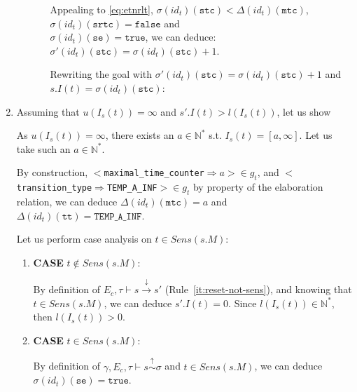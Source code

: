\documentclass[dvipsnames,12pt]{article}
\begin{document}
\begin{niproof}
\begin{enumerate}
\begin{enumerate}
\begin{enumerate}
        Appealing to \eqref{eq:etnrlt},
        $\sigma(id_t)(\texttt{stc})<\Delta(id_t)(\texttt{mtc})$,
        $\sigma(id_t)(\texttt{srtc})=\mathtt{false}$ and\\
        $\sigma(id_t)(\texttt{se})=\mathtt{true}$, we can deduce:
        $\sigma'(id_t)(\texttt{stc})=\sigma(id_t)(\texttt{stc})+1$.

        Rewriting the goal with
        $\sigma'(id_t)(\texttt{stc})=\sigma(id_t)(\texttt{stc})+1$ and
        $s.I(t)=\sigma(id_t)(\texttt{stc})$: 
      \end{enumerate}
    \end{enumerate}
    
  \item

    Assuming that $u(I_s(t))=\infty$ and
    $s'.I(t)>{}l(I_s(t))$, let us show\\

    As $u(I_s(t))=\infty$, there exists an $a\in\mathbb{N}^{*}$
    s.t. $I_s(t)=[a,\infty]$. Let us take such an
    $a\in\mathbb{N}^{*}$.

    By construction,
    ${<}$\texttt{maximal\_time\_counter}$\Rightarrow{}a{>}\in{}g_t$,
    and
    ${<}$\texttt{transition\_type}$\Rightarrow{}$\texttt{TEMP\_A\_INF}${>}\in{}g_t$
    by property of the elaboration relation, we can deduce
    $\Delta(id_t)(\texttt{mtc})=a$ and
    $\Delta(id_t)(\texttt{tt})=\mathtt{TEMP\_A\_INF}$.
    
    Let us perform case analysis on $t\in{}Sens(s.M)$:
    \begin{enumerate}
    \item \textbf{CASE} $t\notin{}Sens(s.M)$:
      
      By definition of $E_c,\tau\vdash{}s\xrightarrow{\downarrow}s'$
      (Rule~\ref{it:reset-not-sens}), and knowing that
      $t\in{}Sens(s.M)$, we can deduce $s'.I(t)=0$. Since
      $l(I_s(t))\in\mathbb{N}^{*}$, then $l(I_s(t))>0$.
      
      
    \item \textbf{CASE} $t\in{}Sens(s.M)$:
      
      By definition of
      $\gamma,E_c,\tau\vdash{}s\stackrel{\uparrow}{\sim}\sigma$ and
      $t\in{}Sens(s.M)$, we can deduce
      $\sigma(id_t)(\texttt{se})=\mathtt{true}$.


\end{enumerate}
\end{enumerate}
\end{niproof}
\end{document}
